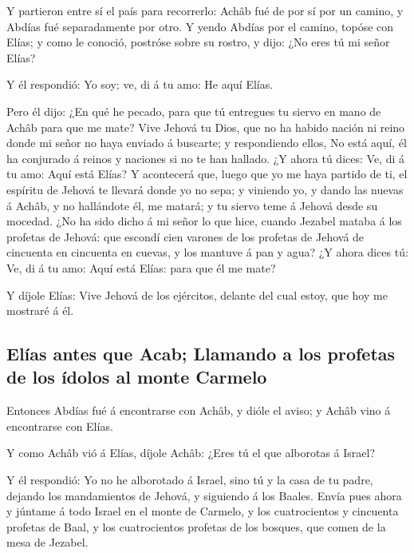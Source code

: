  Y partieron entre sí el país para recorrerlo: Achâb fué de
por sí por un camino, y Abdías fué separadamente por otro. 
Y yendo Abdías por el camino, topóse con Elías; y como le conoció,
postróse sobre su rostro, y dijo: ¿No eres tú mi señor Elías?

 Y él respondió: Yo soy; ve, di á tu amo: He aquí Elías.

 Pero él dijo: ¿En qué he pecado, para que tú entregues tu
siervo en mano de Achâb para que me mate?  Vive Jehová tu
Dios, que no ha habido nación ni reino donde mi señor no haya enviado á
buscarte; y respondiendo ellos, No está aquí, él ha conjurado á reinos y
naciones si no te han hallado.  ¿Y ahora tú dices: Ve, di á
tu amo: Aquí está Elías?  Y acontecerá que, luego que yo me
haya partido de ti, el espíritu de Jehová te llevará donde yo no sepa; y
viniendo yo, y dando las nuevas á Achâb, y no hallándote él, me matará;
y tu siervo teme á Jehová desde su mocedad.  ¿No ha sido
dicho á mi señor lo que hice, cuando Jezabel mataba á los profetas de
Jehová: que escondí cien varones de los profetas de Jehová de cincuenta
en cincuenta en cuevas, y los mantuve á pan y agua?  ¿Y
ahora dices tú: Ve, di á tu amo: Aquí está Elías: para que él me mate?

 Y díjole Elías: Vive Jehová de los ejércitos, delante del
cual estoy, que hoy me mostraré á él.

\hypertarget{eluxedas-antes-que-acab-llamando-a-los-profetas-de-los-uxeddolos-al-monte-carmelo}{%
\subsection{Elías antes que Acab; Llamando a los profetas de los ídolos
al monte
Carmelo}\label{eluxedas-antes-que-acab-llamando-a-los-profetas-de-los-uxeddolos-al-monte-carmelo}}

 Entonces Abdías fué á encontrarse con Achâb, y dióle el
aviso; y Achâb vino á encontrarse con Elías.

 Y como Achâb vió á Elías, díjole Achâb: ¿Eres tú el que
alborotas á Israel?

 Y él respondió: Yo no he alborotado á Israel, sino tú y la
casa de tu padre, dejando los mandamientos de Jehová, y siguiendo á los
Baales.  Envía pues ahora y júntame á todo Israel en el
monte de Carmelo, y los cuatrocientos y cincuenta profetas de Baal, y
los cuatrocientos profetas de los bosques, que comen de la mesa de
Jezabel.

